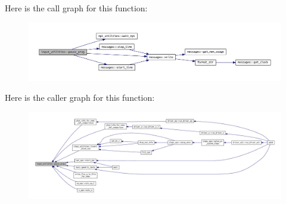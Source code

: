 Here is the call graph for this function\+:
\nopagebreak
\begin{figure}[H]
\begin{center}
\leavevmode
\includegraphics[width=350pt]{namespaceinput__utilities_a71bd36f063d55ab62c7a37864aef1185_cgraph}
\end{center}
\end{figure}
Here is the caller graph for this function\+:
\nopagebreak
\begin{figure}[H]
\begin{center}
\leavevmode
\includegraphics[width=350pt]{namespaceinput__utilities_a71bd36f063d55ab62c7a37864aef1185_icgraph}
\end{center}
\end{figure}
